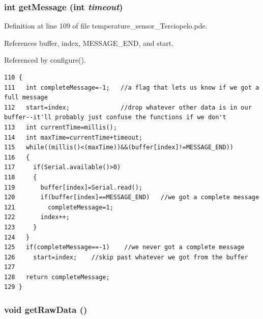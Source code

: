 \hypertarget{temperature__sensor___terciopelo_8pde_8f2521044963073c55b3c290fffd79e3}{
\subsubsection[{getMessage}]{\setlength{\rightskip}{0pt plus 5cm}int getMessage (int {\em timeout})}}
\label{temperature__sensor___terciopelo_8pde_8f2521044963073c55b3c290fffd79e3}




Definition at line 109 of file temperature\_\-sensor\_\-Terciopelo.pde.

References buffer, index, MESSAGE\_\-END, and start.

Referenced by configure().

\begin{Code}\begin{verbatim}110 {
111   int completeMessage=-1;   //a flag that lets us know if we got a full message
112   start=index;              //drop whatever other data is in our buffer--it'll probably just confuse the functions if we don't
113   int currentTime=millis();
114   int maxTime=currentTime+timeout;  
115   while((millis()<(maxTime))&&(buffer[index]!=MESSAGE_END))
116   {
117     if(Serial.available()>0)
118     {
119       buffer[index]=Serial.read();
120       if(buffer[index]==MESSAGE_END)   //we got a complete message
121         completeMessage=1;
122       index++;
123     }
124   }
125   if(completeMessage==-1)    //we never got a complete message
126     start=index;    //skip past whatever we got from the buffer
127 
128   return completeMessage;
129 }
\end{verbatim}
\end{Code}


\hypertarget{temperature__sensor___terciopelo_8pde_cfc975251dbc3a8c9a9b11f8df62cc41}{
\subsubsection[{getRawData}]{\setlength{\rightskip}{0pt plus 5cm}void getRawData ()}}
\label{temperature__sensor___terciopelo_8pde_cfc975251dbc3a8c9a9b11f8df62cc41}


